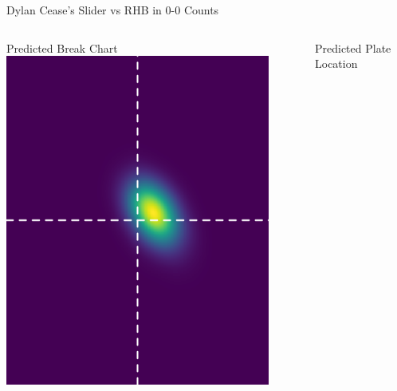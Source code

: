 \documentclass{beamer}
\begin{document}
  \begin{frame}{Dylan Cease's Slider vs RHB in 0-0 Counts}
    \begin{columns}
      \begin{column}{0.5\textwidth}
        \centering
        Predicted Break Chart\\
        \vspace{4mm}
        \includegraphics[width = 0.9\textwidth]{images/656302_SL_R_0_0_break.png}
      \end{column}
      \begin{column}{0.5\textwidth}
        \centering
        Predicted Plate Location\\
        \vspace{4mm}

\end{column}
\end{columns}
\end{frame}
\end{document}
